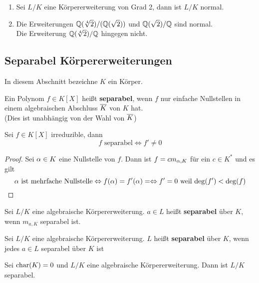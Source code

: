 	\begin{exm}
		\begin{enumerate}
			\item Sei $L/K$ eine Körpererweiterung von Grad 2, dann ist $L/K$ normal.
			\item Die Erweiterungen $\mathbb{Q}(\sqrt[4]{2})/(\mathbb{Q}(\sqrt{2}))$ und $\mathbb{Q}(\sqrt{2})/\mathbb{Q}$ sind normal.\\
			Die Erweiterung $\mathbb{Q}(\sqrt[4]{2})/\mathbb{Q}$ hingegen nicht.
		\end{enumerate}
	\end{exm}


\subsection{Separabel Körpererweiterungen}
In diesem Abschnitt bezeichne $K$ ein Körper.

	\begin{definition}
		Ein Polynom $f\in K[X]$ heißt \textbf{separabel}, wenn $f$ nur einfache Nullstellen in einem algebraischen Abschluss $\overline{K}$ von $K$ hat.\\
		(Dies ist unabhängig von der Wahl von $\overline{K}$)
	\end{definition}

	\begin{satz}
		Sei $f\in K[X]$ irreduzible, dann
		\[\text{$f$ separabel}\Leftrightarrow f'\neq 0\]
	\end{satz}
	\begin{proof}
		Sei $\alpha\in K$ eine Nullstelle von $f$. Dann ist $f=cm_{\alpha,K}$ für ein $c\in K^*$ und  es gilt
		\[\text{$\alpha$ ist mehrfache Nullstelle}\Leftrightarrow f(\alpha)=f'(\alpha)=\Leftrightarrow \text{$f'=0$ weil $\deg(f')<\deg(f)$}\]
	\end{proof}

	\begin{definition}
		Sei $L/K$ eine algebraische Körpererweiterung. $a\in L$ heißt \textbf{separabel} über $K$, wenn $m_{a,K}$ separabel ist.
	\end{definition}

	\begin{definition}
		Sei $L/K$ eine algebraische Körpererweiterung. $L$ heißt \textbf{separabel} über $K$, wenn jedes $a\in L$ separabel über $K$ ist
	\end{definition}


	\begin{satz}
		Sei $\operatorname{char}(K)=0$ und $L/K$ eine algebraische Körpererweiterung. Dann ist $L/K$ separabel.
	\end{satz}

